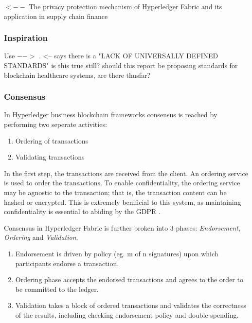 

\cite{ma_privacy_2019} $<--$ The privacy protection mechanism of Hyperledger Fabric and its application in supply chain finance





\subsubsection{Inspiration} %
Use $-->$ \cite{yuan_design_2018}. <-- says there is a "LACK OF UNIVERSALLY DEFINED STANDARDS" is this true still? should this report be proposing standards for blockchain healthcare systems, are there thusfar?

\subsubsection{Consensus}

In Hyperledger business blockchain frameworks consensus is reached by performing two seperate activities:
\begin{enumerate}
  \item Ordering of transactions
  \item Validating transactions
\end{enumerate}
In the first step, the transactions are received from the client.
An ordering service is used to order the transactions. 
To enable confidentiality, the ordering service may be agnostic to the transaction; that is, the transaction content can be hashed or encrypted.\cite{noauthor_hyperledger_2017}
This is extremely benificial to this system, as maintaining confidentiality is essential to abiding by the GDPR \cite{noauthor_general_nodate}.

Consensus in Hyperledger Fabric is further broken into 3 phases: \emph{Endorsement}, \emph{Ordering} and \emph{Validation}.
\begin{enumerate}
  \item Endorsement is driven by policy (eg. m of n signatures) upon which participants endorse a transaction. 
  \item Ordering phase accepts the endorsed transactions and agrees to the order to be committed to the ledger.
  \item Validation takes a block of ordered transactions and validates the correctness of the results, including checking endorsement policy and double-spending.
\end{enumerate}

